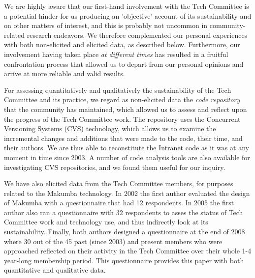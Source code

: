 \documentclass{sig-alt-release2}
\begin{document}
We are highly aware that our first-hand involvement with the Tech Committee is a potential hinder for us producing an 'objective' account of its sustainability and on other matters of interest, and this is probably not uncommon in community-related research endeavors. We therefore complemented our personal experiences with both non-elicited and elicited data, as described below. Furthermore, our involvement having taken place {\it at different times} has resulted in a fruitful confrontation process that allowed us to depart from our personal opinions and arrive at more reliable and valid results.

For assessing quantitatively and qualitatively the sustainability of the Tech Committee and its practice, we regard as non-elicited data the {\it code repository} that the community has maintained, which allowed us to assess and reflect upon the progress of the Tech Committee work. The repository uses the Concurrent Versioning Systems (CVS) technology, which allows us to examine the incremental changes and additions that were made to the code, their time, and their authors. We are thus able to reconstitute the Intranet code as it was at any moment in time since 2003. A number of code analysis tools are also available for investigating CVS repositories, and we found them useful for our inquiry.

We have also elicited data from the Tech Committee members, for purposes related to the Makumba technology. In 2002 the first author evaluated the design of Makumba with a questionnaire that had 12 respondents. In 2005 the first author also ran a questionnaire with 32 respondents to asses the status of Tech Committee work and technology use, and thus indirectly look at its sustainability. Finally, both authors designed a questionnaire at the end of 2008 where 30 out of the 45 past (since 2003) and present members who were approached reflected on their activity in the Tech Committee over their whole 1-4 year-long membership period. This questionnaire provides this paper with both quantitative and qualitative data. 
\end{document}
